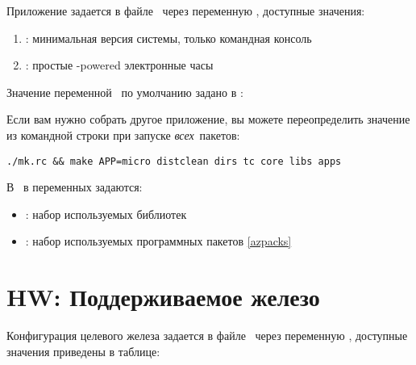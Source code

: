 Приложение задается в файле \ через
переменную , доступные значения:

\begin{enumerate}
  \item {}: минимальная версия системы, только командная консоль
  \item {}: простые \linux-powered электронные часы
\end{enumerate}

Значение переменной \ по умолчанию задано в :


Если вам нужно собрать другое приложение, вы можете переопределить значение из
командной строки при запуске \emph{всех}\ пакетов:

\begin{verbatim}
./mk.rc && make APP=micro distclean dirs tc core libs apps
\end{verbatim}

В \ в переменных задаются:

\begin{itemize}
  \item {}: набор используемых библиотек
  \item {}: набор используемых программных пакетов \ref{azpacks}
\end{itemize}



\section{HW: Поддерживаемое железо}\label{azhw}

Конфигурация целевого железа задается в файле \ через
переменную , доступные значения приведены в таблице:

